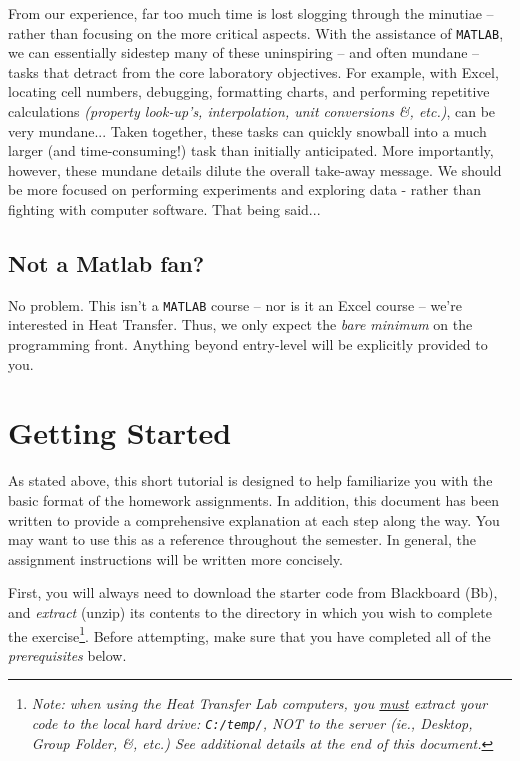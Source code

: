 \documentclass[11pt, letterpaper]{article}
\begin{document}
From our experience, far too much time is lost slogging through the minutiae -- rather than focusing on the more critical aspects. With the assistance of \texttt{MATLAB}, we can essentially sidestep many of these uninspiring -- and often mundane -- tasks that detract from the core laboratory objectives. For example, with Excel, locating cell numbers, debugging, formatting charts, and performing repetitive calculations \textit{(property look-up's, interpolation, unit conversions \&, etc.)}, can be very mundane... Taken together, these tasks can quickly snowball into a much larger (and time-consuming!) task than initially anticipated. More importantly, however, these mundane details dilute the overall take-away message. We should be more focused on performing experiments and exploring data - rather than fighting with computer software. That being said...


\subsection*{Not a Matlab fan?}

No problem. This isn't a \texttt{MATLAB} course --  nor is it an Excel course -- we're interested in Heat Transfer.  Thus, we only expect the \textit{bare minimum} on the programming front. Anything beyond entry-level will be explicitly provided to you.

\section*{Getting Started}
As stated above, this short tutorial is designed to help familiarize you with the basic format of the homework assignments. In addition, this document has been written to provide a comprehensive explanation at each step along the way. You may want to use this as a reference throughout the semester. In general, the assignment instructions will be written more concisely. 

\n
First, you will always need to download the starter code from Blackboard (Bb), and \textit{extract} (unzip) its contents to the directory in which you wish to complete the exercise\footnote{\textit{Note: when using the Heat Transfer Lab computers, you \ul{must} extract your code to the local hard drive: \texttt{C:/temp/}, NOT to the server (ie., Desktop, Group Folder, \&, etc.) See additional details at the end of this document.}}. Before attempting, make sure that you have completed all of the \textit{prerequisites} below.
\end{document}
